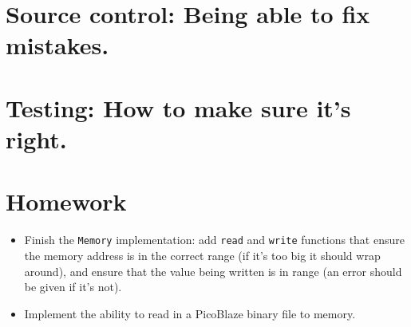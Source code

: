 \documentclass[12pt,a4paper]{article}
\begin{document}
\pagebreak
\section{Source control: Being able to fix mistakes.}

\pagebreak
\section{Testing: How to make sure it's right.}

\pagebreak
\section{Homework}

\begin{itemize}
  \item Finish the \texttt{Memory} implementation: add \texttt{read}
    and \texttt{write} functions that ensure the memory address is in
    the correct range (if it's too big it should wrap around), and
    ensure that the value being written is in range (an error should
    be given if it's not).

  \item Implement the ability to read in a PicoBlaze binary file to
    memory.
\end{itemize}
\end{document}

